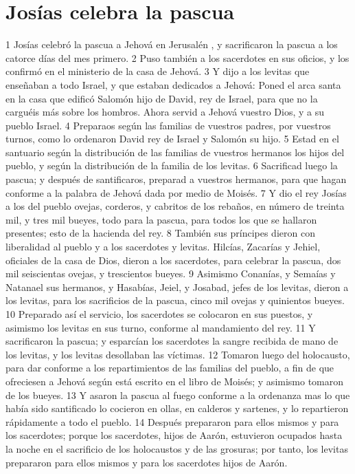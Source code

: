 \section*{Josías celebra la pascua}

1 Josías celebró la pascua a Jehová en Jerusalén , y sacrificaron la pascua a los catorce días del mes primero.
2 Puso también a los sacerdotes en sus oficios, y los confirmó en el ministerio de la casa de Jehová.
3 Y dijo a los levitas que enseñaban a todo Israel, y que estaban dedicados a Jehová: Poned el arca santa en la casa que edificó Salomón hijo de David, rey de Israel, para que no la carguéis más sobre los hombros. Ahora servid a Jehová vuestro Dios, y a su pueblo Israel.
4 Preparaos según las familias de vuestros padres, por vuestros turnos, como lo ordenaron David rey de Israel y Salomón su hijo. 
5 Estad en el santuario según la distribución de las familias de vuestros hermanos los hijos del pueblo, y según la distribución de la familia de los levitas.
6 Sacrificad luego la pascua; y después de santificaros, preparad a vuestros hermanos, para que hagan conforme a la palabra de Jehová dada por medio de Moisés.
7 Y dio el rey Josías a los del pueblo ovejas, corderos, y cabritos de los rebaños, en número de treinta mil, y tres mil bueyes, todo para la pascua, para todos los que se hallaron presentes; esto de la hacienda del rey.
8 También sus príncipes dieron con liberalidad al pueblo y a los sacerdotes y levitas. Hilcías, Zacarías y Jehiel, oficiales de la casa de Dios, dieron a los sacerdotes, para celebrar la pascua, dos mil seiscientas ovejas, y trescientos bueyes.
9 Asimismo Conanías, y Semaías y Natanael sus hermanos, y Hasabías, Jeiel, y Josabad, jefes de los levitas, dieron a los levitas, para los sacrificios de la pascua, cinco mil ovejas y quinientos bueyes.
10 Preparado así el servicio, los sacerdotes se colocaron en sus puestos, y asimismo los levitas en sus turno, conforme al mandamiento del rey.
11 Y sacrificaron la pascua; y esparcían los sacerdotes la sangre recibida de mano de los levitas, y los levitas desollaban las víctimas.
12 Tomaron luego del holocausto, para dar conforme a los repartimientos de las familias del pueblo, a fin de que ofreciesen a Jehová según está escrito en el libro de Moisés; y asimismo tomaron de los bueyes.
13 Y asaron la pascua al fuego conforme a la ordenanza  mas lo que había sido santificado lo cocieron en ollas, en calderos y sartenes, y lo repartieron rápidamente a todo el pueblo.
14 Después prepararon para ellos mismos y para los sacerdotes; porque los sacerdotes, hijos de Aarón, estuvieron ocupados hasta la noche en el sacrificio de los holocaustos y de las grosuras; por tanto, los levitas prepararon para ellos mismos y para los sacerdotes hijos de Aarón.
